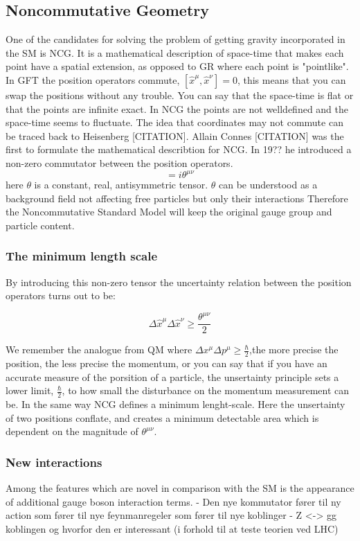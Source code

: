 \subsection{Noncommutative Geometry}
One of the candidates for solving the problem of getting gravity incorporated in the SM is NCG. It is a mathematical description of space-time that makes each point have a spatial extension, as opposed to GR where each point is "pointlike". In GFT the position operators commute, $[ \hat x^{\mu}, \hat x^{\nu}] = 0$, this means that you can swap the positions without any trouble. You can say that the space-time is flat or that the points are infinite exact. In NCG the points are not welldefined and the space-time seems to fluctuate. The idea that coordinates may not commute can be traced back to Heisenberg [CITATION]. Allain Connes [CITATION] was the first to formulate the mathematical describtion for NCG. In 19?? he introduced a non-zero commutator between the position operators. 
\begin{equation}
[ \hat x^{\mu}, \hat x^{\nu}] = i \theta^{\mu \nu}
\end{equation}
here 	$\theta$ is a constant, real, antisymmetric tensor. $\theta$ can be understood as a background field not affecting free particles but only their interactions Therefore the Noncommutative Standard Model will keep the original gauge group and particle content.


\subsubsection{The minimum length scale}
By introducing this non-zero tensor the uncertainty relation between the position operators turns out to be:

\begin{equation}
\Delta \hat x^{\mu} \Delta \hat x^{\nu} \ge \frac{\theta^{\mu \nu}}{2}
\end{equation}

We remember the analogue from QM where $\Delta x^{\mu} \Delta p^{\mu} \ge \frac{\hbar}{2}$,the more precise the position, the less precise the momentum, or you can say that if you have an accurate measure of the porsition of a particle, the unsertainty principle sets a lower limit, $\frac{\hbar}{2}$, to how small the disturbance on the momentum measurement can be. In the same way NCG defines a minimum lenght-scale. Here the unsertainty of two positions conflate, and creates a minimum detectable area which is dependent on the magnitude of $\theta^{\mu \nu}$.

\subsubsection{New interactions}
Among the features which are novel in comparison with the SM is the appearance of additional gauge 
boson interaction terms.
- Den nye kommutator fører til ny action som fører til nye feynmanregeler som fører til nye koblinger
- Z <-> gg koblingen og hvorfor den er interessant (i forhold til at teste teorien ved LHC)


